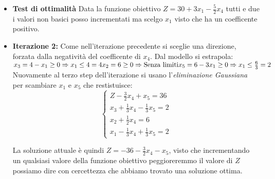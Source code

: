 \documentclass{article}
\newcommand*\circled[1]{\tikz[baseline=(char.base)]{
            \node[shape=circle,draw,inner sep=1pt] (char) {#1};}}
\begin{document}
\begin{tcolorbox}[breakable]
\begin{itemize}
\begin{enumerate}
          \end{enumerate}
    \item \circled{2}\textbf{Test di ottimalità}
          Data la funzione obiettivo $Z=30+3x_1-\frac{5}{2}x_4$ tutti e due i valori non basici posso incrementati ma scelgo $x_1$ visto che ha un coefficente positivo.
    \item \textbf{Iterazione 2:}
          Come nell'iterazione precedente si sceglie una direzione, forzata dalla negatività del coefficente di $x_4$. Dal modello si estrapola:
          $ \\
            x_3=4-x_1 \ge 0 \Rightarrow x_1 \le 4 = 4 \\
            x_2 = 6 \ge 0 \Rightarrow \text{Senza limiti} \\
            x_5= 6-3x_1\ge0\Rightarrow x_1 \le \frac{6}{3} = 2\\
          $
          Nuovamente al terzo step dell'iterazione si usano l'\textit{eliminazione Gaussiana} per scambiare $x_1$ e $x_5$ che restistuisce:
          $$
            \begin{cases}
              Z-\frac{3}{2}x_4+x_5=36             \\
              x_3+\frac{1}{3}x_4-\frac{1}{3}x_5=2 \\
              x_2 + \frac{1}{2}x_4=6              \\
              x_1 -\frac{1}{3}x_4+\frac{1}{3}x_5=2
            \end{cases}
          $$

          La soluzione attuale è quindi $Z=-36-\frac{3}{2}x_4-x_5$, visto che incrementando un qualsiasi valore della funzione obiettivo peggioreremmo il valore di $Z$ possiamo dire con cercettezza che abbiamo trovato una soluzione ottima.
  \end{itemize}
\end{tcolorbox}
\end{document}
